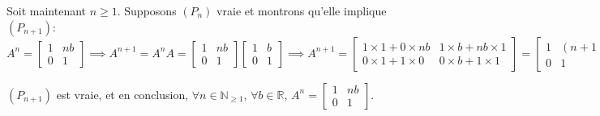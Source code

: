 \documentclass{article}
\newcommand{\N}{\mathbb{N}}
\newcommand{\R}{\mathbb{R}}
\begin{document}
\noindent Soit maintenant $n\geq1$. Supposons $(P_n)$ vraie et montrons qu'elle implique $(P_{n+1})$:
$$A^n = \begin{bmatrix}
1 & nb \\ 0 & 1 \end{bmatrix} \implies A^{n+1} = A^n A = \begin{bmatrix}
1 & nb \\ 0 & 1 \end{bmatrix}  \begin{bmatrix}
1 & b \\ 0 & 1 \end{bmatrix} \implies A^{n+1} = \begin{bmatrix}
1\times 1 + 0\times nb & 1\times b + nb \times 1 \\ 0\times 1 + 1\times 0 & 0 \times b + 1 \times 1 \end{bmatrix} = \begin{bmatrix} 1 & (n+1)b \\ 0 & 1 \end{bmatrix}$$

\noindent $(P_{n+1})$ est vraie, et en conclusion, $\forall n \in \N_{\geq 1}$, $\forall b \in \R$, $A^n = \begin{bmatrix}
1 & nb \\ 0 & 1 \end{bmatrix}$. \\
\end{document}
